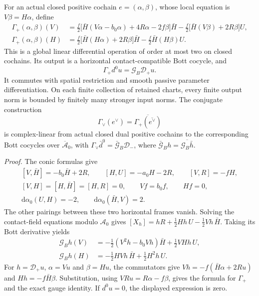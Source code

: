 \documentclass[
  english,
  11pt,
  reqno]{amsart}
\begin{document}
For an actual closed positive cochain \(e=(\alpha,\beta)\), whose local
equation is \(V\beta=H\alpha\), define%
 \[
\begin{aligned}
\Gamma_+(\alpha,\beta)(V)
&=\frac f2\bigl[\bar H(V\alpha-b_0\alpha)+4R\alpha-2f\beta\bigr]\bar H
 -\frac f2\bigl[\bar H(V\beta)+2R\beta\bigr]U,\\
\Gamma_+(\alpha,\beta)(H)
&=\frac f2\bigl[\bar H(H\alpha)+2R\beta\bigr]\bar H
 -\frac f2\bar H(H\beta)U.
\end{aligned}
\] This is a global linear differential operation of order at most two
on closed cochains. Its output is a horizontal contact-compatible Bott
cocycle, and%
 \[
\Gamma_+d^0u=\mathcal G_B\mathcal D_+u.
\] It commutes with spatial restriction and smooth passive parameter
differentiation. On each finite collection of retained charts, every
finite output norm is bounded by finitely many stronger input norms. The
conjugate construction%
 \[
\Gamma_\vee(e^\vee)=\overline{\Gamma_+(\overline{e^\vee})}
\] is complex-linear from actual closed dual positive cochains to the
corresponding Bott cocycles over \(\overline{\mathcal A}_0\), with
\(\Gamma_\vee\bar d^0=\bar{\mathcal G}_B\mathcal D_-\), where
\(\bar{\mathcal G}_Bh=\overline{\mathcal G_B\bar h}\).

\emph{Proof.} The conic formulas give%
 \[
\begin{gathered}
[V,\bar H]=-b_0\bar H+2R,\qquad
[H,U]=-a_0H-2R,\qquad [V,R]=-fH,\\
[V,H]=[H,\bar H]=[H,R]=0,\qquad
Vf=b_0f,\qquad Hf=0,\\
\mathrm d\alpha_0(U,H)=-2,\qquad
\mathrm d\alpha_0(\bar H,V)=2.
\end{gathered}
\] The other pairings between these two horizontal frames vanish.
Solving the contact-field equations modulo \(\mathcal A_0\) gives
\([X_h]=hR+\tfrac12Hh\,U-\tfrac12Vh\,\bar H\). Taking its Bott
derivative yields%
 \[
\begin{aligned}
\mathcal G_Bh(V)
&=-\frac12(V^2h-b_0Vh)\bar H+\frac12VHh\,U,\\
\mathcal G_Bh(H)
&=-\frac12HVh\,\bar H+\frac12H^2h\,U.
\end{aligned}
\] For \(h=\mathcal D_+u\), \(\alpha=Vu\) and \(\beta=Hu\), the
commutators give \(Vh=-f(\bar H\alpha+2Ru)\) and \(Hh=-f\bar H\beta\).
Substitution, using \(VRu=R\alpha-f\beta\), gives the formula for
\(\Gamma_+\) and the exact gauge identity. If \(d^0u=0\), the displayed
expression is zero.
\end{document}
